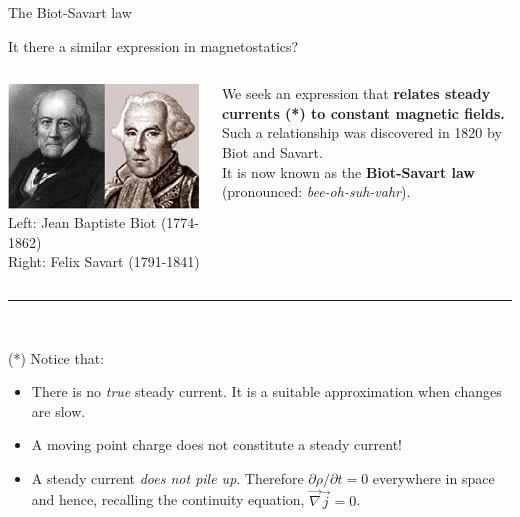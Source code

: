 %
%
%

\begin{frame}{The Biot-Savart law}

It there a similar expression in magnetostatics? \\

\vspace{0.3cm}

\begin{columns}
  \begin{column}{0.40\textwidth}
     \includegraphics[width=0.99\textwidth]{./images/people/biot_and_savart.jpg}\\
     {\scriptsize
        Left: Jean Baptiste Biot (1774-1862)\\
        Right: Felix Savart (1791-1841)\\
     }
  \end{column}
  \begin{column}{0.60\textwidth}
      We seek an expression that {\bf relates steady currents (*) to constant magnetic fields.}\\
      \vspace{0.3cm}
      Such a relationship was discovered in 1820 by Biot and Savart.\\
      \vspace{0.3cm}
      It is now known as the {\bf Biot-Savart law}\\
       (pronounced: {\it bee-oh-suh-vahr}).\\
  \end{column}
\end{columns}

\vspace{0.4cm}

\noindent\rule{2cm}{0.4pt}\\
{\scriptsize
  (*) Notice that:
   \begin{itemize}
      \item There is no {\em true} steady current. It is a suitable approximation when changes are slow.
      \item A moving point charge does not constitute a steady current!
      \item A steady current {\em does not pile up}. Therefore $\partial \rho / \partial t = 0$ everywhere in space and hence,
                recalling the continuity equation, $\vec{\nabla} \vec{j} = 0$.
   \end{itemize}
}
\end{frame}

